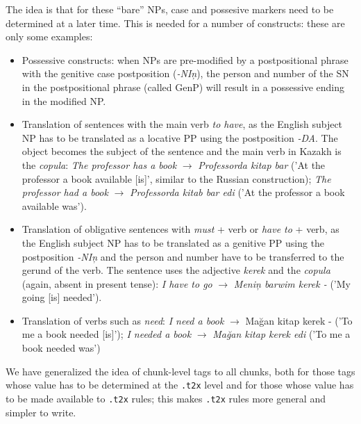 \documentclass{article}
\begin{document}
The idea is that for these ``bare'' NPs, case and possesive markers need to be determined at a later time. This is needed for a number of constructs: these are only some examples:
\begin{itemize}
\item Possessive constructs: when NPs are pre-modified by a postpositional phrase with the genitive case postposition (\emph{-NI\c{n}}), the person and number of the SN in the postpositional phrase (called \(\mathrm{GenP}\)) will result in a possessive ending in the modified NP.
\item Translation of sentences with the main verb \emph{to have}, as the English subject NP has to be translated as a locative PP using the postposition \emph{-DA}. The object becomes the subject of the sentence and the main verb in Kazakh is the \emph{copula}:
\emph{The professor has a book} \(\to\) \emph{Professorda kitap bar} ('At the professor a book available [is]',  similar to the Russian construction); \emph{The professor had a book} \(\to\) \emph{Professorda kitab bar edi} ('At the professor a book available was').
\item Translation of obligative sentences with \emph{must} + verb or \emph{have to} + verb, as the English subject NP has to be translated as a genitive PP using the postposition \emph{-NI\c{n}} and the person and  number have to be transferred to the gerund of the verb. The sentence uses the adjective \emph{kerek} and the \emph{copula} (again, absent in present tense):
\emph{I have to go} \(\to\) \emph{Meni\c{n} barwim kerek -} ('My going [is] needed').
\item Translation of verbs such as \emph{need}: \emph{I need a book} \(\to\) {Ma\u{g}an kitap kerek -} ('To me a book needed [is]'); \emph{I needed a book} \(\to\) \emph{Ma\u{g}an kitap kerek edi} ('To me a book needed was')
\end{itemize}
We have generalized the idea of chunk-level tags to all chunks, both for those tags whose value has to be determined at the \texttt{.t2x} level and for those whose value has to be made available to \texttt{.t2x} rules; this makes \texttt{.t2x} rules more general and simpler to write.
\end{document}
